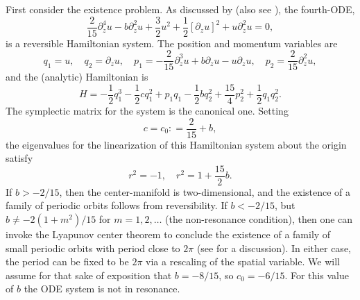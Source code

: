 \documentclass[review,onefignum,onetabnum]{siamart171218}
\def\coloneqq{\mathrel{\mathop:}=}
\begin{document}
First consider the existence problem. As discussed by
\cite[Section~4]{sandstede:hfb13} (also see \cite{champneys:agi97}), the
fourth-ODE,
\[
\frac2{15}\partial_z^4u-b\partial_z^2u+\frac32u^2
+\frac12[\partial_zu]^2+u\partial_z^2u=0,
\]
is a reversible Hamiltonian system. The position and momentum variables
are
\[
q_1=u,\quad q_2=\partial_zu,\quad p_1=-\frac2{15}\partial_z^3u+b\partial_zu-u\partial_zu,\quad
p_2=\frac2{15}\partial_z^2u,
\]
and the (analytic) Hamiltonian is
\[
H=-\frac12q_1^3-\frac12cq_1^2+p_1q_1-\frac12bq_2^2+\frac{15}{4}p_2^2+\frac12q_1q_2^2.
\]
The symplectic matrix for the system is the canonical one. Setting
\[
c=c_0\coloneqq\frac{2}{15}+b,
\]
the eigenvalues for the linearization of this Hamiltonian system about the
origin satisfy
\[
r^2=-1,\quad r^2=1+\frac{15}{2}b.
\]
If $b>-2/15$, then the center-manifold is two-dimensional, and the existence
of a family of periodic orbits follows from reversibility. If $b<-2/15$, but
$b\neq-2(1+m^2)/15$ for $m=1,2,\dots$ (the non-resonance condition), then one
can invoke the Lyapunov center theorem to conclude the existence of a family
of small periodic orbits with period close to $2\pi$ (see
\cite{buzzi:rhl05,weinstein:nmf73} for a discussion). In either case, the
period can be fixed to be $2\pi$ via a rescaling of the spatial variable. We will assume for that sake of exposition that $b=-8/15$, so $c_0=-6/15$. For this value of $b$ the ODE system is not in resonance.
\end{document}
